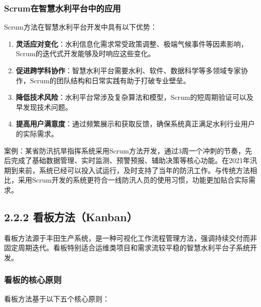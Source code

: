 \subsubsection{Scrum在智慧水利平台中的应用}\label{scrumux5728ux667aux6167ux6c34ux5229ux5e73ux53f0ux4e2dux7684ux5e94ux7528}

Scrum方法在智慧水利平台开发中具有以下优势：

\begin{enumerate}
\def\labelenumi{\arabic{enumi}.}
\item
  \textbf{灵活应对变化}：水利信息化需求常受政策调整、极端气候事件等因素影响，Scrum的迭代式开发能够及时响应这些变化。
\item
  \textbf{促进跨学科协作}：智慧水利平台需要水利、软件、数据科学等多领域专家协作，Scrum的团队结构和日常实践有助于打破专业壁垒。
\item
  \textbf{降低技术风险}：水利平台常涉及复杂算法和模型，Scrum的短周期验证可以及早发现技术问题。
\item
  \textbf{提高用户满意度}：通过频繁展示和获取反馈，确保系统真正满足水利行业用户的实际需求。
\end{enumerate}

案例：某省防汛抗旱指挥系统采用Scrum方法开发，通过3周一个冲刺的节奏，先后完成了基础数据管理、实时监测、预警预报、辅助决策等核心功能。在2021年汛期到来前，系统已经可以投入试运行，及时支持了当年的防汛工作。与传统方法相比，采用Scrum开发的系统更符合一线防汛人员的使用习惯，功能更加贴合实际需求。

\subsection{2.2.2
看板方法（Kanban）}\label{ux770bux677fux65b9ux6cd5kanban}

看板方法源于丰田生产系统，是一种可视化工作流程管理方法，强调持续交付而非固定周期迭代。看板特别适合运维类项目和需求流较平稳的智慧水利平台子系统开发。

\subsubsection{看板的核心原则}\label{ux770bux677fux7684ux6838ux5fc3ux539fux5219}

看板方法基于以下五个核心原则：

